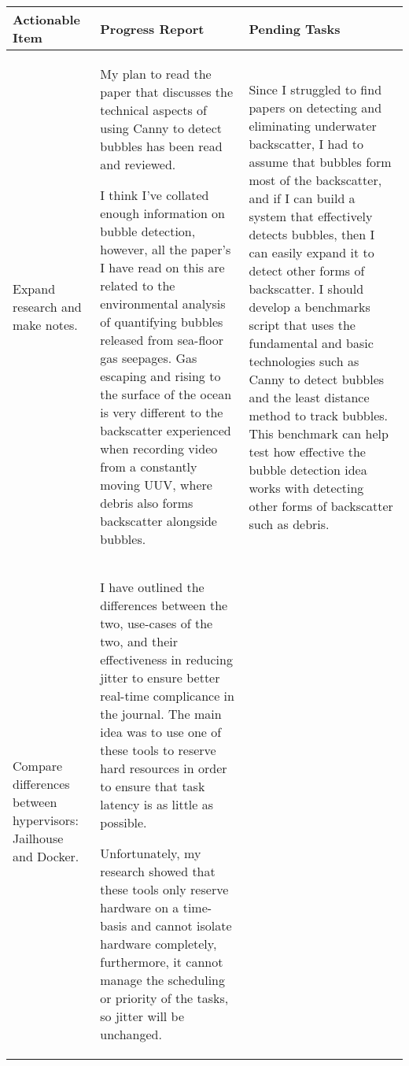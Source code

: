 \begin{table}[!h]
    \centering
    \begin{tabularx}{\textwidth}{|X|X|X|}
        \hline
        Actionable Item & Progress Report & Pending Tasks \\
        \hline
        \hline
        Expand research and make notes. & 
        \begin{myitemize}
            \item My plan to read the paper that discusses the technical aspects of using Canny to detect bubbles has been read and reviewed.
            \item I think I've collated enough information on bubble detection, however, all the paper's I have read on this are related to the environmental analysis of quantifying bubbles released from sea-floor gas seepages. Gas escaping and rising to the surface of the ocean is very different to the backscatter experienced when recording video from a constantly moving UUV, where debris also forms backscatter alongside bubbles.
        \end{myitemize} & 
        \begin{myitemize}
            \item Since I struggled to find papers on detecting and eliminating underwater backscatter, I had to assume that bubbles form most of the backscatter, and if I can build a system that effectively detects bubbles, then I can easily expand it to detect other forms of backscatter. I should develop a benchmarks script that uses the fundamental and basic technologies such as Canny to detect bubbles and the least distance method to track bubbles. This benchmark can help test how effective the bubble detection idea works with detecting other forms of backscatter such as debris.
        \end{myitemize} \\
        \hline
        Compare differences between hypervisors: Jailhouse and Docker. & 
        \begin{myitemize}
            \item I have outlined the differences between the two, use-cases of the two, and their effectiveness in reducing jitter to ensure better real-time complicance in the journal. The main idea was to use one of these tools to reserve hard resources in order to ensure that task latency is as little as possible.
            \item Unfortunately, my research showed that these tools only reserve hardware on a time-basis and cannot isolate hardware completely, furthermore, it cannot manage the scheduling or priority of the tasks, so jitter will be unchanged.

\end{myitemize}
\end{tabularx}
\end{table}
